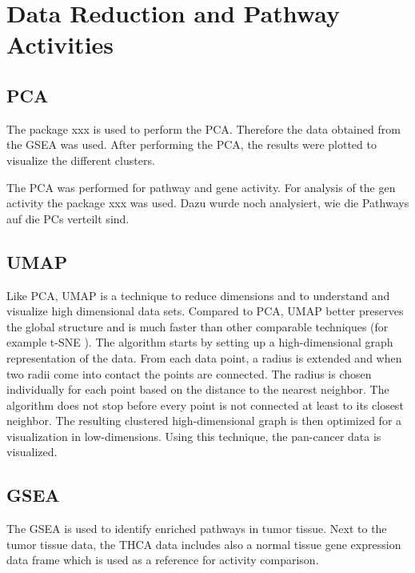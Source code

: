 \documentclass[
  parskip,
  oneside]{scrreprt}
\begin{document}
\hypertarget{data-reduction-and-pathway-activities}{%
\section{Data Reduction and Pathway
Activities}\label{data-reduction-and-pathway-activities}}

\hypertarget{pca}{%
\subsection{PCA}\label{pca}}

The package xxx is used to perform the PCA. Therefore the data obtained
from the GSEA was used. After performing the PCA, the results were
plotted to visualize the different clusters.

The PCA was performed for pathway and gene activity. For analysis of the
gen activity the package xxx was used. Dazu wurde noch analysiert, wie
die Pathways auf die PCs verteilt sind.

\hypertarget{umap}{%
\subsection{UMAP}\label{umap}}

Like PCA, UMAP is a technique to reduce dimensions and to understand and
visualize high dimensional data sets. Compared to PCA, UMAP better
preserves the global structure and is much faster than other comparable
techniques (for example t-SNE \cite{xxx}). The algorithm starts by
setting up a high-dimensional graph representation of the data. From
each data point, a radius is extended and when two radii come into
contact the points are connected. The radius is chosen individually for
each point based on the distance to the nearest neighbor. The algorithm
does not stop before every point is not connected at least to its
closest neighbor. The resulting clustered high-dimensional graph is then
optimized for a visualization in low-dimensions. Using this technique,
the pan-cancer data is visualized.

\hypertarget{gsea}{%
\subsection{GSEA}\label{gsea}}

The GSEA is used to identify enriched pathways in tumor tissue. Next to
the tumor tissue data, the THCA data includes also a normal tissue gene
expression data frame which is used as a reference for activity
comparison.
\end{document}
